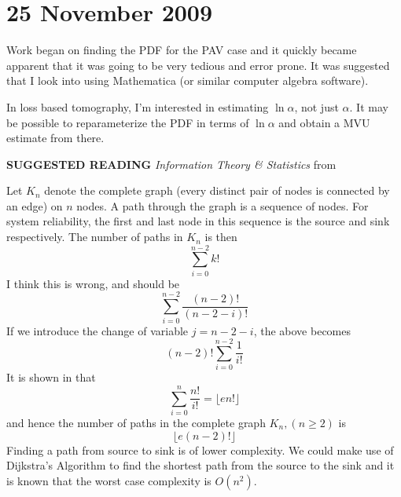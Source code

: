 \section{25 November 2009}
Work began on finding the \ac{PDF} for the \ac{PAV} case and it quickly became apparent that it was going to be very tedious and error prone. It was suggested that I look into using Mathematica (or similar computer algebra software).

In loss based tomography, I'm interested in estimating $\ln \alpha$, not just $\alpha$. It may be possible to reparameterize the \ac{PDF} in terms of $\ln \alpha$ and obtain a \ac{MVU} estimate from there.

\textbf{SUGGESTED READING} \emph{Information Theory \& Statistics} from \cite{cover-1991}

Let $K_n$ denote the complete graph (every distinct pair of nodes is connected by an edge) on $n$ nodes. A path through the graph is a sequence of nodes. For system reliability, the first and last node in this sequence is the source and sink respectively. The number of paths in $K_n$ is then
\[\displaystyle\sum_{i=0}^{n-2}k!\]
I think this is wrong, and should be
\[\displaystyle\sum_{i=0}^{n-2}\frac{(n-2)!}{(n-2-i)!}\]
If we introduce the change of variable $j = n - 2 - i$, the above becomes
\[(n-2)!\displaystyle\sum_{i=0}^{n-2}\frac{1}{i!}\]
It is shown in \cite{hassani-2004} that
\[ \displaystyle\sum_{i=0}^{n}\frac{n!}{i!}=\lfloor en! \rfloor\]
and hence the number of paths in the complete graph $K_n, ( n \geq 2)$ is
\begin{equation}
\lfloor e(n-2)! \rfloor
\end{equation}
Finding a path from source to sink is of lower complexity. We could make use of Dijkstra's Algorithm to find the shortest path from the source to the sink and it is known that the worst case complexity is $O(n^2)$\cite{kumar-2004}.